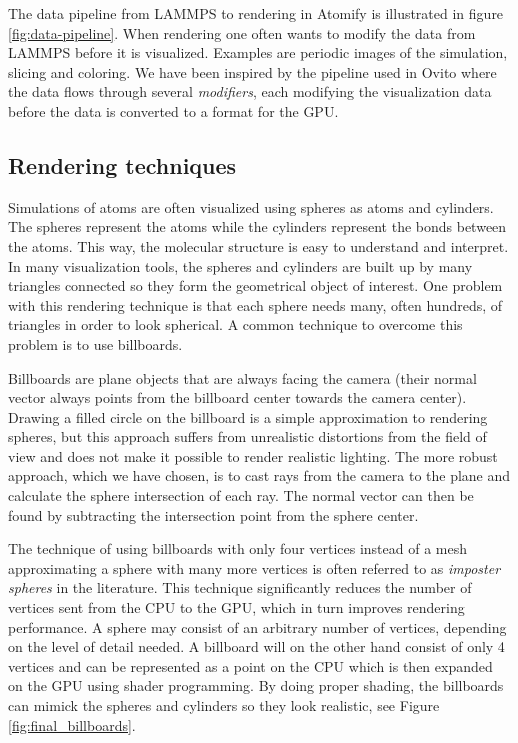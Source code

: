 \documentclass[aps,pre,twocolumn,letterpaper,floatfix,nofootinbib]{revtex4}
\begin{document}
The data pipeline from LAMMPS to rendering in Atomify is illustrated in figure
\ref{fig:data-pipeline}.
When rendering one often wants to modify the data from LAMMPS before it is
visualized.
Examples are periodic images of the simulation,
slicing and coloring.
We have been inspired by the pipeline used in Ovito where the data flows through
several \textit{modifiers}, each modifying the visualization data before the
data is converted to a format for the GPU.

\subsection{Rendering techniques}

Simulations of atoms are often visualized using spheres as atoms and cylinders.
The spheres represent the atoms while the cylinders represent the bonds between
the atoms.
This way, the molecular structure is easy to understand and interpret.
In many visualization tools, the spheres and cylinders are built up by many
triangles connected so they form the geometrical object of interest.
One problem with this rendering technique is that each sphere needs many,
often hundreds, of triangles in order to look spherical.
A common technique to overcome this problem is to use billboards.

Billboards are plane objects that are always facing the camera (their normal
vector always points from the billboard center towards the camera center).
Drawing a filled circle on the billboard is a simple approximation to rendering
spheres, but this approach suffers from unrealistic distortions from the field
of view and does not make it possible to render realistic lighting.
The more robust approach, which we have chosen,
is to cast rays from the camera to the plane and calculate the sphere
intersection of each ray.
The normal vector can then be found by subtracting the intersection point from
the sphere center.

The technique of using billboards with only four vertices instead of a mesh
approximating a sphere with many more vertices is often referred to as
\emph{imposter spheres} in the literature.
This technique significantly reduces the number of vertices sent from the CPU to
the GPU, which in turn improves rendering performance.
A sphere may consist of an arbitrary number of vertices,
depending on the level of detail needed.
A billboard will on the other hand consist of only 4 vertices and can be
represented as a point on the CPU which is then expanded on the GPU using shader
programming.
By doing proper shading, the billboards can mimick the spheres and cylinders so
they look realistic, see Figure \ref{fig:final_billboards}.
\end{document}
